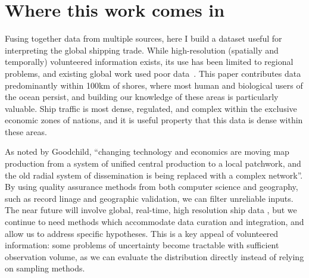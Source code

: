 \section{Where this work comes in}

Fusing together data from multiple sources, here I build a dataset useful for interpreting the global shipping trade. While high-resolution (spatially and temporally) volunteered information exists, its use has been limited to regional problems, and existing global work used poor data~\citep{Corbett2007, Halpern2008}. This paper contributes data predominantly within 100km of shores, where most human and biological users of the ocean persist, and building our knowledge of these areas is particularly valuable. Ship traffic is most dense, regulated, and complex within the exclusive economic zones of nations, and it is useful property that this data is dense within these areas.

As noted by Goodchild, ``changing technology and economics are moving map production from a system of unified central production to a local patchwork, and the old radial system of dissemination is being replaced with a complex network''\citep{goodchild1999cartographic}. By using quality assurance methods from both computer science and geography, such as record linage and geographic validation, we can filter unreliable inputs. The near future will involve global, real-time, high resolution ship data \citep{JonesGoogle2012,carson2012satellite}, but we continue to need methods which accommodate data curation and integration, and allow us to address specific hypotheses. This is a key appeal of volunteered information: some problems of uncertainty become tractable with sufficient observation volume, as we can evaluate the distribution directly instead of relying on sampling methods.
